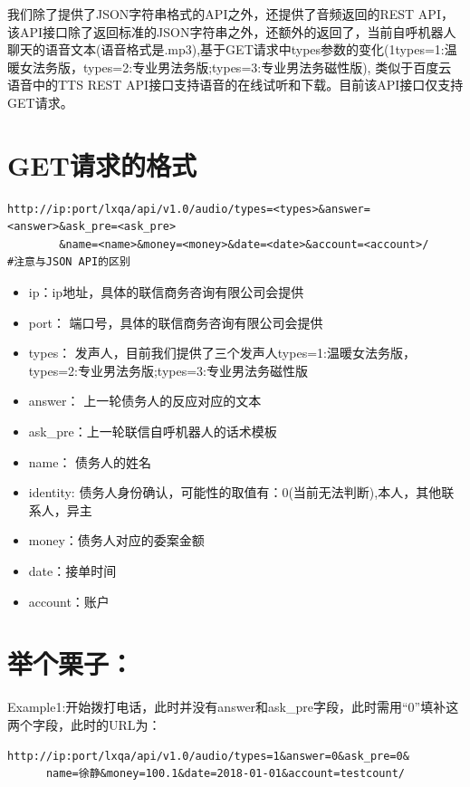 \documentclass[]{book}
\begin{document}
我们除了提供了JSON字符串格式的API之外，还提供了音频返回的REST
API，该API接口除了返回标准的JSON字符串之外，还额外的返回了，当前自呼机器人聊天的语音文本(语音格式是.mp3),基于GET请求中types参数的变化(1types=1:温暖女法务版，types=2:专业男法务版;types=3:专业男法务磁性版),
类似于百度云语音中的TTS REST
API接口支持语音的在线试听和下载。目前该API接口仅支持GET请求。

\section{\texorpdfstring{\textbf{GET请求的格式}}{GET请求的格式}}\label{get-1}

\begin{verbatim}
http://ip:port/lxqa/api/v1.0/audio/types=<types>&answer=<answer>&ask_pre=<ask_pre>
        &name=<name>&money=<money>&date=<date>&account=<account>/
#注意与JSON API的区别
\end{verbatim}

\begin{itemize}
\item
  ip：ip地址，具体的联信商务咨询有限公司会提供
\item
  port： 端口号，具体的联信商务咨询有限公司会提供
\item
  types：
  发声人，目前我们提供了三个发声人types=1:温暖女法务版，types=2:专业男法务版;types=3:专业男法务磁性版
\item
  answer： 上一轮债务人的反应对应的文本
\item
  ask\_pre：上一轮联信自呼机器人的话术模板
\item
  name： 债务人的姓名
\item
  identity:
  债务人身份确认，可能性的取值有：0(当前无法判断),本人，其他联系人，异主
\item
  money：债务人对应的委案金额
\item
  date：接单时间
\item
  account：账户
\end{itemize}

\section{\texorpdfstring{\textbf{举个栗子：}}{举个栗子：}}\label{-1}

Example1:开始拨打电话，此时并没有answer和ask\_pre字段，此时需用``0''填补这两个字段，此时的URL为：

\begin{verbatim}
http://ip:port/lxqa/api/v1.0/audio/types=1&answer=0&ask_pre=0&
      name=徐静&money=100.1&date=2018-01-01&account=testcount/
\end{verbatim}
\end{document}
